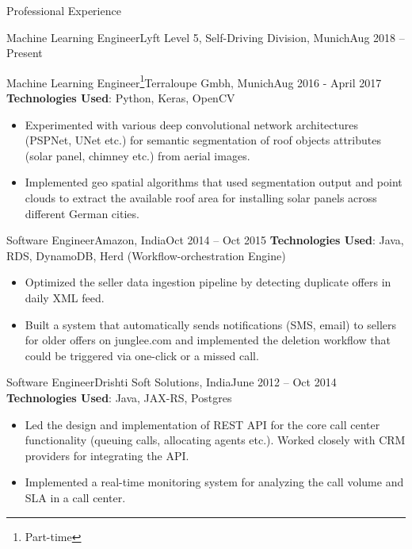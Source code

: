 \documentclass[]{mcdowellcv}
\begin{document}
\begin{cvsection}{Professional Experience}
\begin{cvsubsection}{Machine Learning Engineer}{Lyft Level 5, Self-Driving Division, Munich}{Aug 2018 -- Present}
		\end{cvsubsection}
		
		
		\begin{cvsubsection}{Machine Learning Engineer\footnote{Part-time}}{Terraloupe Gmbh, Munich}{Aug 2016 - April 2017}
			\textbf{Technologies Used}: Python, Keras, OpenCV
			\begin{itemize}
				\item Experimented with various deep convolutional network architectures (PSPNet, UNet etc.) for semantic segmentation of roof objects attributes (solar panel, chimney etc.) from aerial images.
				\item Implemented geo spatial algorithms that used segmentation output and point clouds to extract the available roof area for installing solar panels across different German cities.
			\end{itemize}
		\end{cvsubsection}
		
		
		\begin{cvsubsection}{Software Engineer}{Amazon, India}{Oct 2014 -- Oct 2015}  
			\textbf{Technologies Used}: Java, RDS, DynamoDB, Herd (Workflow-orchestration Engine)
			\begin{itemize}
				\item Optimized the seller data ingestion pipeline by detecting duplicate offers in daily XML feed.
				\item Built a system that automatically sends notifications (SMS, email) to sellers for older offers on junglee.com and implemented the deletion
				workflow that could be triggered via one-click or a missed call.
			\end{itemize}
		\end{cvsubsection}
		
		\begin{cvsubsection}{Software Engineer}{Drishti Soft Solutions, India}{June 2012 -- Oct 2014}
			\textbf{Technologies Used}: Java, JAX-RS, Postgres
			\begin{itemize} 
				\item Led the design and implementation of REST API for the core call center functionality (queuing calls, allocating agents etc.). Worked closely with CRM providers for integrating the API.
				\item Implemented a real-time monitoring system for analyzing the call volume and SLA in a call center. 
			\end{itemize}
		\end{cvsubsection}
	\end{cvsection}
	

	
\end{document}
